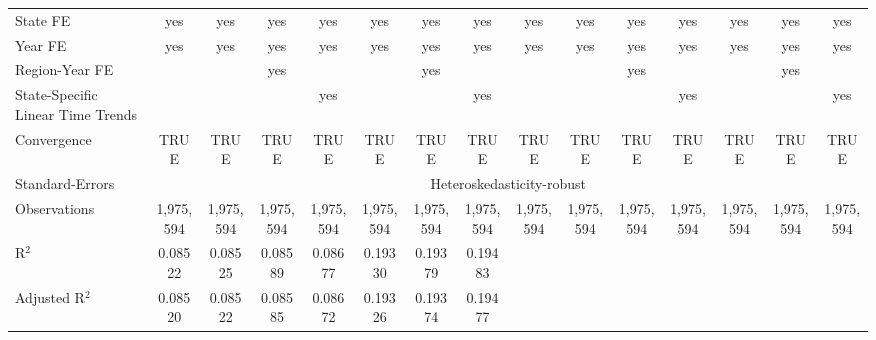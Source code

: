 \documentclass[
]{article}
\let\origtable\table
\let\endorigtable\endtable
\renewenvironment{table}[1][ht]{
      \expandafter\origtable\expandafter[H]
    }{
      \endorigtable
    }
\begin{document}
\begin{table}[htbp]
\begin{adjustbox}{width = 1.5\textwidth, center}
\begin{threeparttable}[b]
\begin{tabular}{lcccccccccccccc}
            State FE                                  & yes            & yes            & yes            & yes            & yes            & yes            & yes            & yes            & yes            & yes            & yes            & yes           & yes           & yes\\  
            Year FE                                   & yes            & yes            & yes            & yes            & yes            & yes            & yes            & yes            & yes            & yes            & yes            & yes           & yes           & yes\\  
            Region-Year FE                            &                &                & yes            &                &                & yes            &                &                &                & yes            &                &               & yes           & \\  
            State-Specific Linear Time Trends         &                &                &                & yes            &                &                & yes            &                &                &                & yes            &               &               & yes\\  
            \midrule 
            Convergence                               &TRUE            & TRUE           & TRUE           & TRUE           & TRUE           & TRUE           & TRUE           & TRUE           & TRUE           & TRUE           & TRUE           & TRUE          & TRUE          & TRUE\\  
            Standard-Errors & \multicolumn{14}{c}{Heteroskedasticity-robust} \\ 
            Observations                              & 1,975,594      & 1,975,594      & 1,975,594      & 1,975,594      & 1,975,594      & 1,975,594      & 1,975,594      & 1,975,594      & 1,975,594      & 1,975,594      & 1,975,594      & 1,975,594     & 1,975,594     & 1,975,594\\  
            R$^2$                                     & 0.08522        & 0.08525        & 0.08589        & 0.08677        & 0.19330        & 0.19379        & 0.19483        &                &                &                &                &               &               & \\  
            Adjusted R$^2$                            & 0.08520        & 0.08522        & 0.08585        & 0.08672        & 0.19326        & 0.19374        & 0.19477        &                &                &                &                &               &               & \\  

\end{tabular}
\end{threeparttable}
\end{adjustbox}
\end{table}
\end{document}
